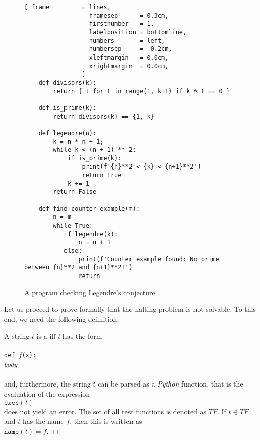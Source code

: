 \begin{figure}[!ht]
\centering
\begin{Verbatim}[ frame         = lines, 
                  framesep      = 0.3cm, 
                  firstnumber   = 1,
                  labelposition = bottomline,
                  numbers       = left,
                  numbersep     = -0.2cm,
                  xleftmargin   = 0.0cm,
                  xrightmargin  = 0.0cm,
                ]
    def divisors(k):
        return { t for t in range(1, k+1) if k % t == 0 }

    def is_prime(k):
        return divisors(k) == {1, k}    
    
    def legendre(n):
        k = n * n + 1;
        while k < (n + 1) ** 2:
            if is_prime(k):
                print(f'{n}**2 < {k} < {n+1}**2')
                return True
            k += 1
        return False

    def find_counter_example(m):
        n = m
        while True:
           if legendre(k):
               n = n + 1
           else:
               print(f'Counter example found: No prime between {n}**2 and {n+1}**2!')
               return
\end{Verbatim}
\vspace*{-0.3cm}
\caption{A program checking Legendre's conjecture.}
\label{fig:legendre.stlx}
\end{figure}

Let us proceed to prove formally that the halting problem is not solvable.  To this end, we need the
following definition.

\begin{Definition} 
A string $t$ is a  iff $t$ has the form \\[0.2cm]
\hspace*{1.3cm} \texttt{}         \\
\hspace*{1.3cm} \texttt{def $f$(x):} \\
\hspace*{1.8cm} \textsl{body}        \\
\hspace*{1.3cm} \texttt{}         \\[0.2cm]
and, furthermore, the string $t$ can be parsed as a \textsl{Python} function, that is the evaluation of
the expression
\\[0.2cm]
\hspace*{1.3cm}
$\texttt{exec}(t)$
\\[0.2cm]
does not yield an error.  
The set of all test functions is denoted as $T\!F$.  If $t \in T\!F$ and $t$ has the name $f$, then
this is written as 
\\[0.2cm]
\hspace*{1.3cm}
$\mathtt{name}(t) = f$. \hspace*{\fill} $\Box$
\end{Definition}

